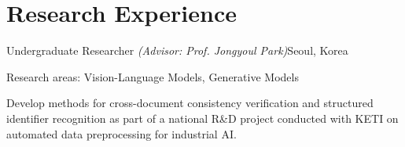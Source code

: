 \section{Research Experience}
      {Undergraduate Researcher \textit{(Advisor: Prof. Jongyoul Park)}}{Seoul, Korea}
\begin{compactitems}
  \item Research areas: Vision-Language Models, Generative Models
  \item Develop methods for cross-document consistency verification and structured
      identifier recognition as part of a national R\&D project conducted with KETI
      on automated data preprocessing for industrial AI.
\end{compactitems}
